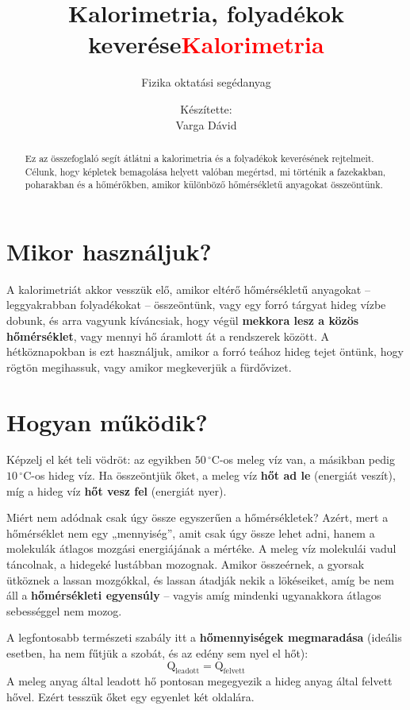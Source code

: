 \documentclass[11pt,a4paper]{article}
\title{Kalorimetria, folyadékok keverése}
\author{Fizika oktatási segédanyag}
\date{}
\providecommand{\textbfr}[1]{\textbf{\textcolor{red}{#1}}}
\begin{document}
\title{\textbfr{Kalorimetria}}
\author{Készítette:\\Varga Dávid}
\date{}
\maketitle

\begin{abstract}
Ez az összefoglaló segít átlátni a kalorimetria és a folyadékok keverésének rejtelmeit. Célunk, hogy képletek bemagolása helyett valóban megértsd, mi történik a fazekakban, poharakban és a hőmérőkben, amikor különböző hőmérsékletű anyagokat összeöntünk.
\end{abstract}

\section{Mikor használjuk?}
A kalorimetriát akkor vesszük elő, amikor eltérő hőmérsékletű anyagokat – leggyakrabban folyadékokat – összeöntünk, vagy egy forró tárgyat hideg vízbe dobunk, és arra vagyunk kíváncsiak, hogy végül \textbf{mekkora lesz a közös hőmérséklet}, vagy mennyi hő áramlott át a rendszerek között. A hétköznapokban is ezt használjuk, amikor a forró teához hideg tejet öntünk, hogy rögtön megihassuk, vagy amikor megkeverjük a fürdővizet.

\section{Hogyan működik?}
Képzelj el két teli vödröt: az egyikben $50\,^\circ\text{C}$-os meleg víz van, a másikban pedig $10\,^\circ\text{C}$-os hideg víz. Ha összeöntjük őket, a meleg víz \textbf{hőt ad le} (energiát veszít), míg a hideg víz \textbf{hőt vesz fel} (energiát nyer). 

Miért nem adódnak csak úgy össze egyszerűen a hőmérsékletek? Azért, mert a hőmérséklet nem egy „mennyiség”, amit csak úgy össze lehet adni, hanem a molekulák átlagos mozgási energiájának a mértéke. A meleg víz molekulái vadul táncolnak, a hidegeké lustábban mozognak. Amikor összeérnek, a gyorsak ütköznek a lassan mozgókkal, és lassan átadják nekik a lökéseiket, amíg be nem áll a \textbf{hőmérsékleti egyensúly} – vagyis amíg mindenki ugyanakkora átlagos sebességgel nem mozog.

A legfontosabb természeti szabály itt a \textbf{hőmennyiségek megmaradása} (ideális esetben, ha nem fűtjük a szobát, és az edény sem nyel el hőt):
$$\text{Q}_{\text{leadott}} = \text{Q}_{\text{felvett}}$$
A meleg anyag által leadott hő pontosan megegyezik a hideg anyag által felvett hővel. Ezért tesszük őket egy egyenlet két oldalára.
\end{document}
